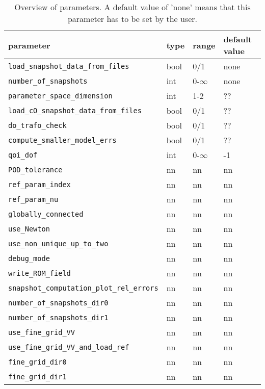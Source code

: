 \documentclass[a4paper,10pt]{article}
\begin{document}
\begin{table}
\centering
\begin{tabular}{| l | l | l | l|}  
\hline
\hline
parameter & type & range  & default value \\
\hline
 \verb|load_snapshot_data_from_files|  & bool  & 0/1 & none \\%
 \verb|number_of_snapshots|  & int  & 0-$\infty$ & none \\%
 \verb|parameter_space_dimension|  & int  & 1-2 & ?? \\%
 \verb|load_cO_snapshot_data_from_files| & bool & 0/1 & ?? \\
 \verb|do_trafo_check| & bool & 0/1 & ?? \\
 \verb|compute_smaller_model_errs| &  bool & 0/1 & ?? \\
 \verb|qoi_dof|  & int  & 0-$\infty$ & -1 \\%
 \verb|POD_tolerance|  & nn  & nn & nn \\%
 \verb|ref_param_index| & nn  & nn & nn \\%
 \verb|ref_param_nu| & nn  & nn & nn \\%
 \verb|globally_connected| & nn  & nn & nn \\%
 \verb|use_Newton| & nn  & nn & nn \\%
 \verb|use_non_unique_up_to_two| & nn  & nn & nn \\%
 \verb|debug_mode| & nn  & nn & nn \\%
 \verb|write_ROM_field| & nn  & nn & nn \\%
 \verb|snapshot_computation_plot_rel_errors| & nn  & nn & nn \\%
 \verb|number_of_snapshots_dir0| & nn  & nn & nn \\%
 \verb|number_of_snapshots_dir1| & nn  & nn & nn \\%
 \verb|use_fine_grid_VV| & nn  & nn & nn \\%
 \verb|use_fine_grid_VV_and_load_ref| & nn  & nn & nn \\%
 \verb|fine_grid_dir0| & nn  & nn & nn \\%
 \verb|fine_grid_dir1| & nn  & nn & nn \\%
\hline
\hline
\end{tabular}
\caption{Overview of parameters. A default value of 'none' means that this parameter has to be set by the user.}
\label{table:parameter_overview}
\end{table} 
\end{document}

